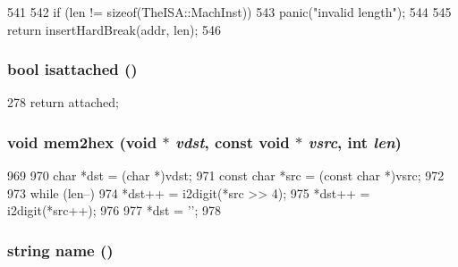 \begin{DoxyCode}
541 {
542     if (len != sizeof(TheISA::MachInst))
543         panic("invalid length\n");
544 
545     return insertHardBreak(addr, len);
546 }
\end{DoxyCode}
\hypertarget{classBaseRemoteGDB_ab1d071ce59a596e7db67b12d384469cc}{
\subsubsection[{isattached}]{\setlength{\rightskip}{0pt plus 5cm}bool isattached ()}}
\label{classBaseRemoteGDB_ab1d071ce59a596e7db67b12d384469cc}



\begin{DoxyCode}
278 { return attached; }
\end{DoxyCode}
\hypertarget{classBaseRemoteGDB_ae31bb2c456fc82307f7ab60a59d81e62}{
\subsubsection[{mem2hex}]{\setlength{\rightskip}{0pt plus 5cm}void mem2hex (void $\ast$ {\em vdst}, \/  const void $\ast$ {\em vsrc}, \/  int {\em len})}}
\label{classBaseRemoteGDB_ae31bb2c456fc82307f7ab60a59d81e62}



\begin{DoxyCode}
969 {
970     char *dst = (char *)vdst;
971     const char *src = (const char *)vsrc;
972 
973     while (len--) {
974         *dst++ = i2digit(*src >> 4);
975         *dst++ = i2digit(*src++);
976     }
977     *dst = '\0';
978 }
\end{DoxyCode}
\hypertarget{classBaseRemoteGDB_aa62b508d2c0e7d9cec12924965276eb5}{
\subsubsection[{name}]{\setlength{\rightskip}{0pt plus 5cm}string name ()}}
\label{classBaseRemoteGDB_aa62b508d2c0e7d9cec12924965276eb5}



